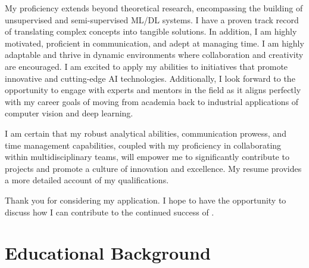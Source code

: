 \documentclass[11pt, a4paper, sans, final]{moderncv}
\begin{document}
My proficiency extends beyond theoretical research, encompassing the building of unsupervised and semi-supervised ML/DL systems. I have a proven track record of translating complex concepts into tangible solutions. In addition, I am highly motivated, proficient in communication, and adept at managing time. I am highly adaptable and thrive in dynamic environments where collaboration and creativity are encouraged. I am excited to apply my abilities to initiatives that promote innovative and cutting-edge AI technologies. Additionally, I look forward to the opportunity to engage with experts and mentors in the field as it aligns perfectly with my career goals of moving from academia back to industrial applications of computer vision and deep learning.
 
I am certain that my robust analytical abilities, communication prowess, and time management capabilities, coupled with my proficiency in collaborating within multidisciplinary teams, will empower me to significantly contribute to projects and promote a culture of innovation and excellence. My resume provides a more detailed account of my qualifications. 

Thank you for considering my application. I hope to have the opportunity to discuss how I can contribute to the continued success of \companyName.

\makeletterclosing


\newpage
\makecvtitle
\section{Educational Background}
\medskip

\end{document}
